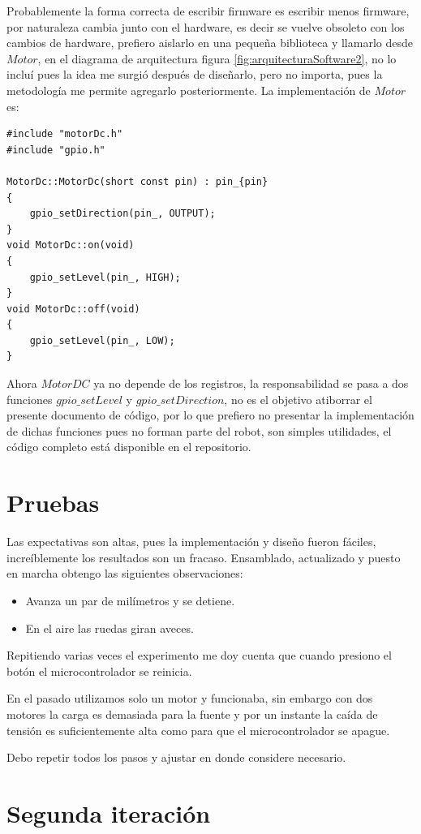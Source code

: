 Probablemente la forma correcta de escribir firmware es escribir menos firmware,
por naturaleza cambia junto con el hardware, es decir se vuelve obsoleto con los
cambios de hardware, prefiero aislarlo en una pequeña 
biblioteca y llamarlo desde $Motor$, en el diagrama de arquitectura 
figura \ref{fig:arquitecturaSoftware2}, no lo incluí pues la idea me surgió después
de diseñarlo,
pero no importa, pues la metodología me permite agregarlo posteriormente. La 
implementación de $Motor$ es:
\begin{verbatim}
#include "motorDc.h"
#include "gpio.h"

MotorDc::MotorDc(short const pin) : pin_{pin}
{
	gpio_setDirection(pin_, OUTPUT);
}
void MotorDc::on(void)
{
	gpio_setLevel(pin_, HIGH);
}
void MotorDc::off(void)
{
	gpio_setLevel(pin_, LOW);
}
\end{verbatim}
Ahora $MotorDC$ ya no depende de los registros, la responsabilidad se pasa a dos
funciones $gpio\_setLevel$ y $gpio\_setDirection$, no es el objetivo atiborrar el 
presente documento de código, por lo que prefiero no presentar la implementación
de dichas funciones pues no forman parte del robot, son simples utilidades, el 
código completo está disponible en el repositorio.
\section{Pruebas}
Las expectativas son altas, pues la implementación y diseño fueron fáciles, 
increíblemente los resultados son un fracaso.
Ensamblado, actualizado y puesto en marcha obtengo las siguientes observaciones:
\begin{itemize}
	\item Avanza un par de milímetros y se detiene.
	\item En el aire las ruedas giran aveces.
\end{itemize}
Repitiendo varias veces el experimento me doy cuenta que cuando presiono el
botón el microcontrolador se reinicia.

En el pasado utilizamos solo un motor y funcionaba, sin embargo con dos motores 
la carga es demasiada para la fuente y por un instante la caída de tensión es
suficientemente alta como para que el microcontrolador se apague. 

Debo repetir todos los pasos y ajustar en donde considere necesario.
\section{Segunda iteración}

